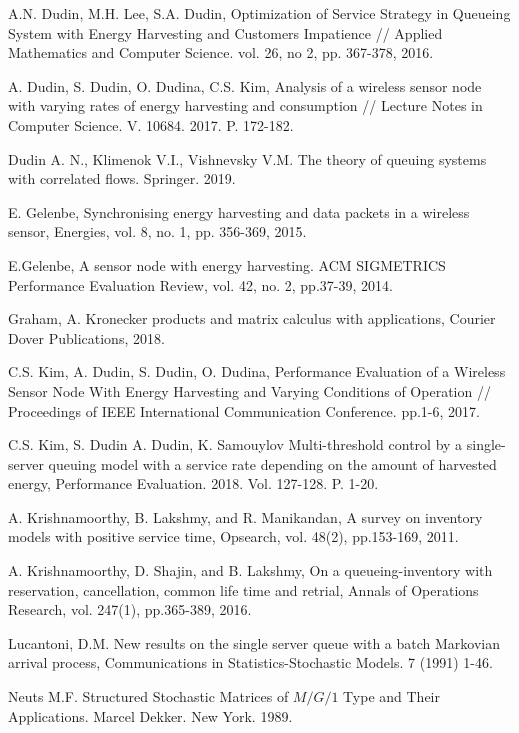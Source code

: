 \documentclass[12pt, a4paper]{article}
\begin{document}
\begin{thebibliography}{8}
 A.N. Dudin, M.H. Lee, S.A. Dudin,  Optimization of Service Strategy in Queueing System with Energy Harvesting and Customers Impatience // Applied Mathematics and Computer Science.  vol. 26, no 2, pp. 367-378, 2016.

 A. Dudin,   S. Dudin, O. Dudina, C.S. Kim, Analysis of  a wireless sensor node with varying rates of energy harvesting and consumption // Lecture Notes in Computer Science. V. 10684. 2017. P. 172-182.

 Dudin A. N., Klimenok V.I., Vishnevsky V.M.   The theory of queuing systems with correlated flows. Springer. 2019.

  E. Gelenbe, Synchronising energy harvesting and data packets
in a wireless sensor, Energies, vol. 8, no. 1, pp. 356-369, 2015.

  E.Gelenbe, A sensor node with energy harvesting. ACM SIGMETRICS Performance Evaluation Review, vol. 42, no. 2, pp.37-39, 2014.

 Graham, A. Kronecker products and matrix calculus with
applications, Courier Dover Publications, 2018.

C.S. Kim, A. Dudin,   S. Dudin, O. Dudina,    Performance Evaluation of a Wireless Sensor Node With Energy Harvesting and Varying Conditions of Operation // Proceedings of IEEE International Communication Conference.  pp.1-6, 2017.

C.S. Kim, S.  Dudin   A. Dudin, K. Samouylov       Multi-threshold control by a single-server queuing model with a service rate depending on the amount of harvested energy, Performance Evaluation. 2018.   Vol. 127-128. P. 1-20.

 A. Krishnamoorthy, B. Lakshmy,  and  R. Manikandan,  A survey on inventory models with positive service time,  Opsearch, vol. 48(2), pp.153-169, 2011.

A. Krishnamoorthy,  D. Shajin, and  B. Lakshmy,  On a queueing-inventory with reservation, cancellation, common life time and retrial, Annals of Operations Research, vol. 247(1), pp.365-389, 2016.

   Lucantoni, D.M.  New results on the single server queue with a
batch Markovian arrival process, Communications in
Statistics-Stochastic Models. 7  (1991) 1-46.

Neuts M.F.     Structured Stochastic Matrices of $M/G/1$ Type and
Their Applications.  Marcel Dekker. New York. 1989.


\end{thebibliography}
\end{document}
